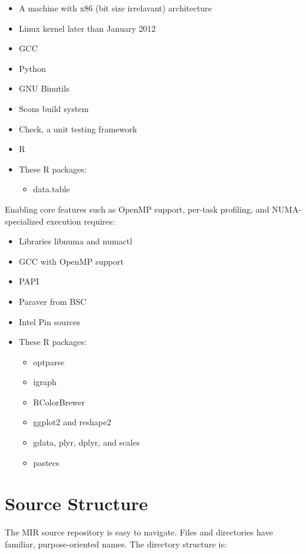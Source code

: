 \documentclass[11pt,a4paper]{article}
\begin{document}
\begin{itemize}
    \item A machine with x86 (bit size irrelavant) architecture
    \item Linux kernel later than January 2012
    \item GCC
    \item Python
    \item GNU Binutils
    \item Scons build system
    \item Check, a unit testing framework
    \item R
    \item These R packages:
    \begin{itemize}
        \item data.table
    \end{itemize}
\end{itemize}

Enabling core features such as OpenMP support, per-task profiling, and NUMA-specialized execution requires:

\begin{itemize}
    \item Libraries libnuma and numactl
    \item GCC with OpenMP support
    \item PAPI
    \item Paraver from BSC
    \item Intel Pin sources
    \item These R packages:
    \begin{itemize}
        \item optparse
        \item igraph
        \item RColorBrewer
        \item ggplot2 and reshape2
        \item gdata, plyr, dplyr, and scales
        \item pastecs
    \end{itemize}
\end{itemize}

\section{Source Structure}\label{sec:source-structure}

The MIR source repository is easy to navigate. Files and directories have familiar, purpose-oriented names. The directory structure is:
\end{document}
